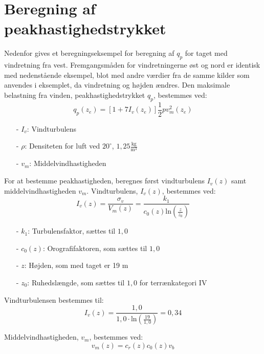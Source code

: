 \chapter{Beregning af peakhastighedstrykket}
Nedenfor gives et beregningseksempel for beregning af $q_p$ for taget med vindretning fra vest. Fremgangsmåden for vindretningerne øst og nord er identisk med nedenstående eksempel, blot med andre værdier fra de samme kilder som anvendes i eksemplet, da vindretning og højden ændres.
\newline
\newline
Den maksimale belastning fra vinden, peakhastighedstrykket $q_p$, bestemmes ved:
\begin{equation}
	q_p(z_e)=[1+7I_v(z_e)]\frac{1}{2}pv_m^2(z_e)
\end{equation}
\begin{itemize}
	\item[-] $I_v$: Vindturbulens
	\item[-] $\rho$: Densiteten for luft ved $20^{\circ}$, $1,\!25 \frac{\text{kg}}{\text{m}^3}$
	\item[-] $v_m$: Middelvindhastigheden
\end{itemize}
For at bestemme peakhastigheden, beregnes først vindturbulens $I_v(z)$ samt middelvindhastigheden $v_m$.
\newline
\newline
Vindturbulens, $I_v(z)$, bestemmes ved:
\begin{equation}
	I_v(z)=\frac{\sigma_v}{V_m(z)}=\frac{k_1}{c_0(z) \text{ln}(\frac{z}{z_0})}
\end{equation}
\begin{itemize}
	\item[-] $k_1$: Turbulensfaktor, sættes til $1,\!0$ \citep[ kapitel 4.4]{EU91}
	\item[-] $c_0(z)$: Orografifaktoren, som sættes til $1,\!0$ \citep[ kapitel 4.3.1]{EU91}
	\item[-] $z$: Højden, som med taget er 19 m
	\item[-] $z_0$: Ruhedslængde, som sættes til $1,\!0$ for terrænkategori IV \citep[ tabel 4.1 kapitel 4.3.2]{EU91}
\end{itemize}
Vindturbulensen bestemmes til:
\begin{equation}
	I_v(z)=\frac{1,\!0}{1,\!0\cdot \text{ln}(\frac{19}{1,0})}=0,\!34
\end{equation}

Middelvindhastigheden, $v_m$, bestemmes ved:
\begin{equation}
	v_m(z)=c_r(z)c_0(z)v_b
\end{equation}

